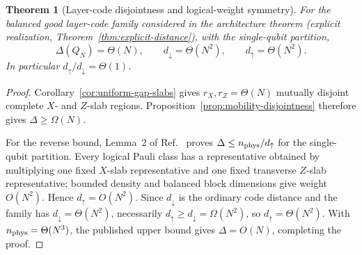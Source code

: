 \documentclass[aps,prx,reprint,superscriptaddress,nofootinbib,floatfix,longbibliography]{revtex4-2}
\newtheorem{theorem}{Theorem}[section]
\theoremstyle{definition}
\begin{document}
\begin{theorem}[Layer-code disjointness and logical-weight symmetry]
\label{thm:layer-disjointness}
For the balanced good layer-code family considered in the architecture theorem (explicit realization, Theorem~\ref{thm:explicit-distance}), with the single-qubit partition,
\begin{equation}
 \Delta(Q_N)=\Theta(N),\qquad
 d_\downarrow=\Theta(N^2),\qquad
 d_\uparrow=\Theta(N^2).
 \label{eq:layer-disjointness-scaling}
\end{equation}
In particular $d_\uparrow/d_\downarrow=\Theta(1)$.
\end{theorem}
\begin{proof}
Corollary~\ref{cor:uniform-gap-slabs} gives $r_X,r_Z=\Theta(N)$ mutually
disjoint complete $X$- and $Z$-slab regions.  Proposition~\ref{prop:mobility-disjointness}
therefore gives $\Delta\ge\Omega(N)$.

For the reverse bound, Lemma~2 of Ref.~\cite{JochymDisjointness} proves $\Delta\le n_{\rm phys}/d_\uparrow$ for the single-qubit partition.  Every logical Pauli class has a representative obtained by multiplying one fixed $X$-slab representative and one fixed transverse $Z$-slab representative; bounded density and balanced block dimensions give weight $O(N^2)$.  Hence $d_\uparrow=O(N^2)$.  Since $d_\downarrow$ is the ordinary code distance and the family has $d_\downarrow=\Theta(N^2)$, necessarily $d_\uparrow\ge d_\downarrow=\Omega(N^2)$, so $d_\uparrow=\Theta(N^2)$.  With $n_{\rm phys}=\Theta(N^3)$, the published upper bound gives $\Delta=O(N)$, completing the proof.
\end{proof}
\end{document}
